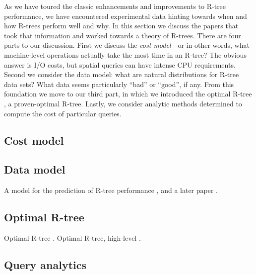 As we have toured the classic enhancements and improvements to R-tree performance, we have encountered experimental data hinting towards when and how R-trees perform well and why.
In this section we discuss the papers that took that information and worked towards a theory of R-trees.
There are four parts to our discussion.
First we discuss the \emph{cost model}---or in other words, what machine-level operations actually take the most time in an R-tree?
The obvious answer is I/O costs, but spatial queries can have intense CPU requirements.
Second we consider the data model: what are natural distributions for R-tree data sets?
What data seems particularly ``bad'' or ``good'', if any.
From this foundation we move to our third part, in which we introduced the optimal R-tree \cite{argeberghaverkortyi04}, a proven-optimal R-tree.
Lastly, we consider analytic methods determined to compute the cost of particular queries.

\subsection{Cost model}

\subsection{Data model}
A model for the prediction of R-tree performance \cite{theodoridissellis96}, and a later paper \cite{theodoridisstefanakissellis00}.

\subsection{Optimal R-tree}
Optimal R-tree \cite{argeberghaverkortyi04}.
Optimal R-tree, high-level \cite{yi12}.


\subsection{Query analytics}
